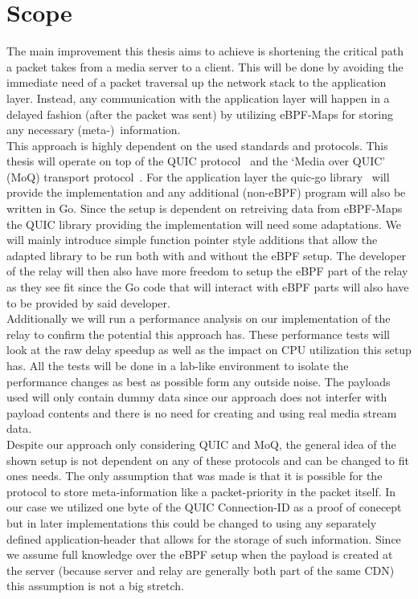 \section{Scope}\label{sec:scope}

The main improvement this thesis aims to achieve is shortening the critical path a packet takes from a media server to a client.
This will be done by avoiding the immediate need of a packet traversal up the network stack to the application layer.
Instead, any communication with the application layer will happen in a delayed fashion (after the packet was sent) by utilizing 
eBPF-Maps for storing any necessary (meta-)~information.
\\
This approach is highly dependent on the used standards and protocols.
This thesis will operate on top of the QUIC protocol~\parencite{rfc-9000} and the `Media over QUIC' (MoQ) 
transport protocol~\parencite{draft-moqtransport}.
For the application layer the quic-go library~\parencite{quic-go-repo} will provide the implementation and 
any additional (non-eBPF) program will also be written in Go.
Since the setup is dependent on retreiving data from eBPF-Maps the QUIC library providing the implementation 
will need some adaptations.
We will mainly introduce simple function pointer style additions that allow the adapted library to be run 
both with and without the eBPF setup.
The developer of the relay will then also have more freedom to setup the eBPF part of the relay as they see fit
since the Go code that will interact with eBPF parts will also have to be provided by said developer.
\\
Additionally we will run a performance analysis on our implementation of the relay to confirm the potential this 
approach has.
These performance tests will look at the raw delay speedup as well as the impact on CPU utilization this 
setup has.
All the tests will be done in a lab-like environment to isolate the performance changes as best as possible
form any outside noise.
The payloads used will only contain dummy data since our approach does not interfer with payload contents 
and there is no need for creating and using real media stream data.
\\
Despite our approach only considering QUIC and MoQ, the general idea of the shown setup is not dependent on 
any of these protocols and can be changed to fit ones needs.
The only assumption that was made is that it is possible for the protocol to store meta-information like a 
packet-priority in the packet itself.
In our case we utilized one byte of the QUIC Connection-ID as a proof of conecept but in later implementations 
this could be changed to using any separately defined application-header that allows for the storage of such 
information.
Since we assume full knowledge over the eBPF setup when the payload is created at the server (because server and 
relay are generally both part of the same CDN) this assumption is not a big stretch.